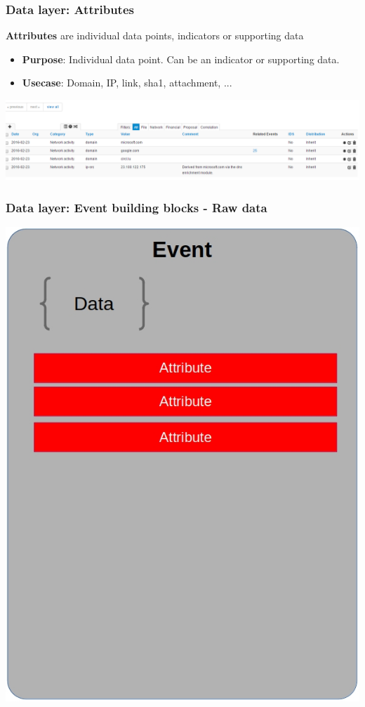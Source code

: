 \begin{frame}[fragile]
    \frametitle{Data layer: Attributes}
        {\bf Attributes} are individual data points, indicators or supporting data
        \begin{itemize}
            \item[] \textbf{Purpose}: Individual data point. Can be an indicator or supporting data.
            \item[] \textbf{Usecase}: Domain, IP, link, sha1, attachment, ...
        \end{itemize}
        \begin{center}
            \includegraphics[width=1.0\linewidth]{screenshots/enrichment4.png}
        \end{center}
\end{frame}

\begin{frame}
    \frametitle{Data layer: Event building blocks - Raw data}
        \begin{center}
            \includegraphics[scale=0.33]{screenshots/event-building-blocks/event-attribute.png}
        \end{center}
\end{frame}

